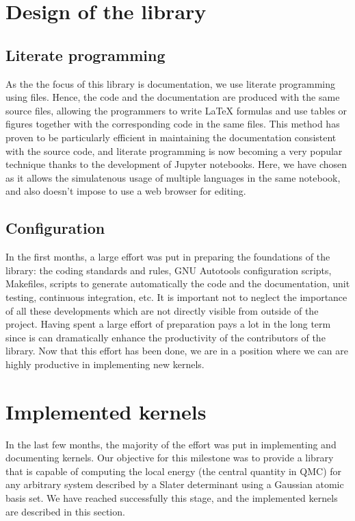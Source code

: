 \section{Design of the library}

\subsection{Literate programming}

As the the focus of this library is documentation, we use literate
programming using {\orgmode} files.\cite{schulte_2012,orgmode}
Hence, the code and the documentation are produced with the same
source files, allowing the programmers to write \LaTeX{} formulas and
use tables or figures together with the corresponding code in the same
files.
This method has proven to be particularly efficient in maintaining the
documentation consistent with the source code, and literate
programming is now becoming a very popular technique thanks to the
development of Jupyter notebooks.
Here, we have chosen {\orgmode} as it allows the simulatenous usage of
multiple languages in the same notebook, and also doesn't impose to
use a web browser for editing.

\subsection{Configuration}

In the first months, a large effort was put in preparing the
foundations of the library: the coding standards and rules, GNU Autotools
configuration scripts, Makefiles, scripts to generate automatically
the code and the documentation, unit testing, continuous integration,
etc. It is important not to neglect the importance of all these
developments which are not directly visible from outside of the project.
Having spent a large effort of preparation pays a lot in the long term
since is can dramatically enhance the productivity of the contributors
of the library.
Now that this effort has been done, we are in a position where we can
are highly productive in implementing new kernels.

\section{Implemented kernels}

In the last few months, the majority of the effort was put in
implementing and documenting kernels. Our objective for this milestone
was to provide a library that is capable of computing the local energy
(the central quantity in \ac{QMC}) for any arbitrary system described
by a Slater determinant using a Gaussian atomic basis set. We have
reached successfully this stage, and the implemented kernels are
described in this section.

